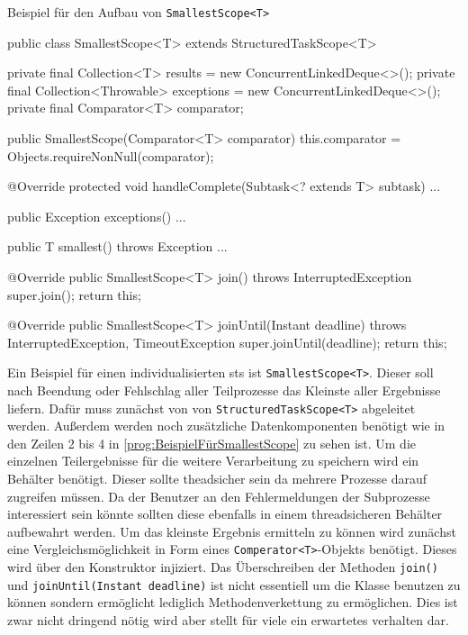     \begin{program} [H]
        \caption{Beispiel für den Aufbau von \texttt{SmallestScope<T>}}
        \label{prog:BeispielFürSmallestScope}
    \begin{JavaCode}[language=Java, numbers=left]
public class SmallestScope<T> extends StructuredTaskScope<T> {
    private final Collection<T> results = new ConcurrentLinkedDeque<>();
    private final Collection<Throwable> exceptions = new ConcurrentLinkedDeque<>();
    private final Comparator<T> comparator;

    public SmallestScope(Comparator<T> comparator) {
        this.comparator = Objects.requireNonNull(comparator);
    }

    @Override
    protected void handleComplete(Subtask<? extends T> subtask) {...}

    public Exception exceptions() {...}

    public T smallest() throws Exception {...}

    @Override
    public SmallestScope<T> join() throws InterruptedException {
        super.join();
        return this;
    }

    @Override
    public SmallestScope<T> joinUntil(Instant deadline)
        throws InterruptedException, TimeoutException{
            super.joinUntil(deadline);
            return this;
    } 
}\end{JavaCode}
    \end{program}
    
    Ein Beispiel für einen individualisierten \gls{sts} ist \texttt{SmallestScope<T>}. Dieser soll nach Beendung oder Fehlschlag aller Teilprozesse das Kleinste 
    aller Ergebnisse liefern.
    Dafür muss zunächst von von \texttt{StructuredTaskScope<T>} abgeleitet werden. Außerdem werden noch zusätzliche Datenkomponenten benötigt wie in den Zeilen 2 bis 4 in
    \ref{prog:BeispielFürSmallestScope} zu sehen ist. 
    Um die einzelnen Teilergebnisse für die weitere Verarbeitung zu speichern wird ein Behälter benötigt.
    Dieser sollte theadsicher sein da mehrere Prozesse darauf zugreifen müssen.
    Da der Benutzer an den Fehlermeldungen der Subprozesse interessiert sein könnte sollten diese ebenfalls in einem threadsicheren Behälter aufbewahrt werden. 
    Um das kleinste Ergebnis ermitteln zu können wird zunächst eine Vergleichsmöglichkeit in Form eines \texttt{Comperator<T>}-Objekts benötigt. Dieses wird über den
    Konstruktor injiziert.
    Das Überschreiben der Methoden \texttt{join()} und \texttt{joinUntil(Instant deadline)} ist nicht essentiell um die Klasse benutzen zu können sondern ermöglicht
    lediglich Methodenverkettung zu ermöglichen. Dies ist zwar nicht dringend nötig wird aber stellt für viele ein erwartetes verhalten dar.

